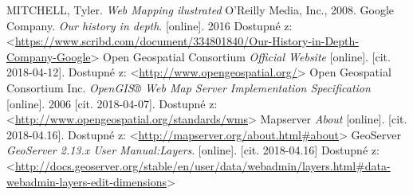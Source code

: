 \documentclass[12pt,a4paper]{article}
\begin{document}
\newpage
\begin{thebibliography}{99}
\label{Bibliography}

MITCHELL, Tyler. \textit{Web Mapping ilustrated} O'Reilly Media, Inc., 2008.
Google Company. \textit{Our history in depth}. [online]. 2016
Dostupné z:\textless\url{https://www.scribd.com/document/334801840/Our-History-in-Depth-Company-Google}\textgreater
{}
Open Geospatial Consortium \textit{Official Website} [online]. [cit. 2018-04-12]. Dostupné z: \textless\url{http://www.opengeospatial.org/}\textgreater
{}
Open Geospatial Consortium Inc. \textit{OpenGIS® Web Map Server Implementation Specification} [online]. 2006 [cit. 2018-04-07].
Dostupné z: \textless\url{http://www.opengeospatial.org/standards/wms}\textgreater
{}
Mapserver \textit{About} [online]. [cit. 2018-04.16].
Dostupné z: \textless\url{http://mapserver.org/about.html#about}\textgreater
{}
GeoServer \textit{GeoServer 2.13.x User Manual:Layers}. [online]. [cit. 2018-04.16]
Dostupné z: \textless\url{http://docs.geoserver.org/stable/en/user/data/webadmin/layers.html#data-webadmin-layers-edit-dimensions}\textgreater


\end{thebibliography}
\end{document}
